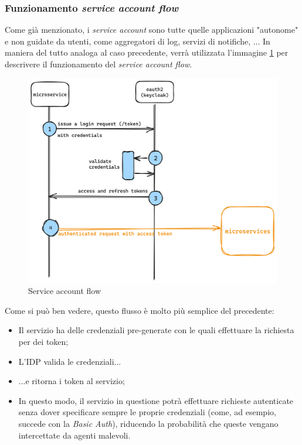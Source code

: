 \subsubsection{Funzionamento \textit{service account flow}}
Come già menzionato, i \textit{service account} sono tutte quelle applicazioni "autonome" e non guidate da utenti, come aggregatori di log, servizi di notifiche, ...\newline
In maniera del tutto analoga al caso precedente, verrà utilizzata l'immagine \ref{fig:sa-flow} per descrivere il funzionamento del \textit{service account flow}.
\begin{figure}[h]
    \centering
    \includegraphics[width=1\textwidth]{files/images/service-account-flow.png}
    \caption{Service account flow}
    \label{fig:sa-flow}
\end{figure}
Come si può ben vedere, questo flusso è molto più semplice del precedente:
\begin{itemize}
    \item Il servizio ha delle credenziali pre-generate con le quali effettuare la richiesta per dei token;
    \item L'IDP valida le credenziali...
    \item ...e ritorna i token al servizio;
    \item In questo modo, il servizio in questione potrà effettuare richieste autenticate senza dover specificare sempre le proprie credenziali (come, ad esempio, succede con la \textit{Basic Auth}), riducendo la probabilità che queste vengano intercettate da agenti malevoli.
\end{itemize}

